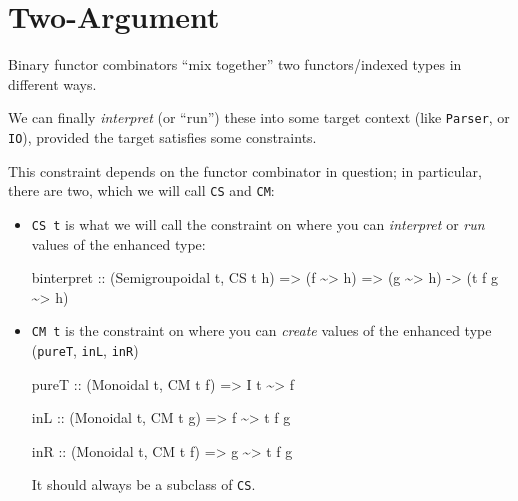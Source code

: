 \documentclass[]{article}
\newenvironment{Shaded}{}{}
\newcommand{\DataTypeTok}[1]{\textcolor[rgb]{0.56,0.13,0.00}{#1}}
\newcommand{\NormalTok}[1]{#1}
\newcommand{\OperatorTok}[1]{\textcolor[rgb]{0.40,0.40,0.40}{#1}}
\newcommand{\OtherTok}[1]{\textcolor[rgb]{0.00,0.44,0.13}{#1}}
\begin{document}
\hypertarget{two-argument}{%
\section{Two-Argument}\label{two-argument}}

Binary functor combinators ``mix together'' two functors/indexed types in
different ways.

We can finally \emph{interpret} (or ``run'') these into some target context
(like \texttt{Parser}, or \texttt{IO}), provided the target satisfies some
constraints.

This constraint depends on the functor combinator in question; in particular,
there are two, which we will call \texttt{CS} and \texttt{CM}:

\begin{itemize}
\item
  \texttt{CS\ t} is what we will call the constraint on where you can
  \emph{interpret} or \emph{run} values of the enhanced type:

\begin{Shaded}
\begin{Highlighting}[]
\NormalTok{binterpret}
\OtherTok{    ::}\NormalTok{ (}\DataTypeTok{Semigroupoidal}\NormalTok{ t, }\DataTypeTok{CS}\NormalTok{ t h)}
    \OtherTok{=>}\NormalTok{ (f }\OperatorTok{\textasciitilde{}>}\NormalTok{ h)}
    \OtherTok{=>}\NormalTok{ (g }\OperatorTok{\textasciitilde{}>}\NormalTok{ h)}
    \OtherTok{{-}>}\NormalTok{ (t f g }\OperatorTok{\textasciitilde{}>}\NormalTok{ h)}
\end{Highlighting}
\end{Shaded}
\item
  \texttt{CM\ t} is the constraint on where you can \emph{create} values of the
  enhanced type (\texttt{pureT}, \texttt{inL}, \texttt{inR})

\begin{Shaded}
\begin{Highlighting}[]
\NormalTok{pureT}
\OtherTok{    ::}\NormalTok{ (}\DataTypeTok{Monoidal}\NormalTok{ t, }\DataTypeTok{CM}\NormalTok{ t f)}
    \OtherTok{=>} \DataTypeTok{I}\NormalTok{ t }\OperatorTok{\textasciitilde{}>}\NormalTok{ f}

\OtherTok{inL ::}\NormalTok{ (}\DataTypeTok{Monoidal}\NormalTok{ t, }\DataTypeTok{CM}\NormalTok{ t g)}
    \OtherTok{=>}\NormalTok{ f }\OperatorTok{\textasciitilde{}>}\NormalTok{ t f g}

\OtherTok{inR ::}\NormalTok{ (}\DataTypeTok{Monoidal}\NormalTok{ t, }\DataTypeTok{CM}\NormalTok{ t f)}
    \OtherTok{=>}\NormalTok{ g }\OperatorTok{\textasciitilde{}>}\NormalTok{ t f g}
\end{Highlighting}
\end{Shaded}

  It should always be a subclass of \texttt{CS}.
\end{itemize}
\end{document}
